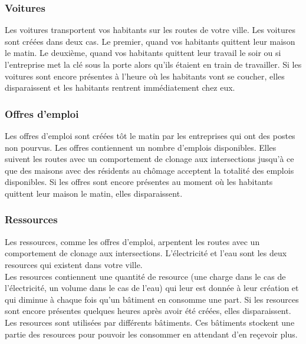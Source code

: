 \documentclass[11pt]{report}
\begin{document}
\subsubsection{Voitures}
Les voitures transportent vos habitants sur les routes de votre ville. Les voitures sont créées dans deux cas. Le premier, quand vos habitants quittent leur maison le matin. Le deuxième, quand vos habitants quittent leur travail le soir ou si l'entreprise met la clé sous la porte alors qu'ils étaient en train de travailler. Si les voitures sont encore présentes à l'heure où les habitants vont se coucher, elles disparaissent et les habitants rentrent immédiatement chez eux.

\subsubsection{Offres d'emploi}
Les offres d'emploi sont créées tôt le matin par les entreprises qui ont des postes non pourvus. Les offres contiennent un nombre d'emplois disponibles. Elles suivent les routes avec un comportement de clonage aux intersections jusqu'à ce que des maisons avec des résidents au chômage acceptent la totalité des emplois disponibles. Si les offres sont encore présentes au moment où les habitants quittent leur maison le matin, elles disparaissent.

\subsubsection{Ressources}
Les ressources, comme les offres d'emploi, arpentent les routes avec un comportement de clonage aux intersections. L'électricité et l'eau sont les deux resources qui existent dans votre ville.\\
Les resources contiennent une quantité de resource (une charge dans le cas de l'électricité, un volume dans le cas de l'eau) qui leur est donnée à leur création et qui diminue à chaque fois qu'un bâtiment en consomme une part. Si les resources sont encore présentes quelques heures après avoir été créées, elles disparaissent. Les resources sont utilisées par différents bâtiments. Ces bâtiments stockent une partie des resources pour pouvoir les consommer en attendant d'en reçevoir plus.



\newpage
\end{document}

